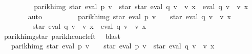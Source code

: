 \begin{isabellebody}
\ \ \ \ \isamarkupfalse%
\ \isamarkupfalse%
\ {\isachardoublequoteopen}{\isasymdots}\ {\isacharequal}{\kern0pt}\ parikh{\isacharunderscore}{\kern0pt}img\ {\isacharparenleft}{\kern0pt}star\ {\isacharparenleft}{\kern0pt}eval\ p\ v{\isacharparenright}{\kern0pt}\ {\isacharat}{\kern0pt}{\isacharat}{\kern0pt}\ star\ {\isacharparenleft}{\kern0pt}star\ {\isacharparenleft}{\kern0pt}eval\ q\ v\ {\isacharat}{\kern0pt}{\isacharat}{\kern0pt}\ v\ x{\isacharparenright}{\kern0pt}\ {\isacharat}{\kern0pt}{\isacharat}{\kern0pt}\ eval\ q\ v\ {\isacharat}{\kern0pt}{\isacharat}{\kern0pt}\ v\ x{\isacharparenright}{\kern0pt}{\isacharparenright}{\kern0pt}{\isachardoublequoteclose}\isanewline
\ \ \ \ \ \ \isamarkupfalse%
\ auto\isanewline
\ \ \ \ \isamarkupfalse%
\ \isamarkupfalse%
\ {\isachardoublequoteopen}{\isasymdots}\ {\isacharequal}{\kern0pt}\ parikh{\isacharunderscore}{\kern0pt}img\ {\isacharparenleft}{\kern0pt}star\ {\isacharparenleft}{\kern0pt}eval\ p\ v{\isacharparenright}{\kern0pt}\ {\isacharat}{\kern0pt}{\isacharat}{\kern0pt}\ {\isacharparenleft}{\kern0pt}{\isacharbraceleft}{\kern0pt}{\isacharbrackleft}{\kern0pt}{\isacharbrackright}{\kern0pt}{\isacharbraceright}{\kern0pt}\ {\isasymunion}\ star\ {\isacharparenleft}{\kern0pt}eval\ q\ v\ {\isacharat}{\kern0pt}{\isacharat}{\kern0pt}\ v\ x{\isacharparenright}{\kern0pt}\isanewline
\ \ \ \ \ \ \ \ {\isacharat}{\kern0pt}{\isacharat}{\kern0pt}\ star\ {\isacharparenleft}{\kern0pt}eval\ q\ v\ {\isacharat}{\kern0pt}{\isacharat}{\kern0pt}\ v\ x{\isacharparenright}{\kern0pt}\ {\isacharat}{\kern0pt}{\isacharat}{\kern0pt}\ eval\ q\ v\ {\isacharat}{\kern0pt}{\isacharat}{\kern0pt}\ v\ x{\isacharparenright}{\kern0pt}{\isacharparenright}{\kern0pt}{\isachardoublequoteclose}\isanewline
\ \ \ \ \ \ \isamarkupfalse%
\ parikh{\isacharunderscore}{\kern0pt}img{\isacharunderscore}{\kern0pt}star{}\ parikh{\isacharunderscore}{\kern0pt}conc{\isacharunderscore}{\kern0pt}left\ \isamarkupfalse%
\ blast\isanewline
\ \ \ \ \isamarkupfalse%
\ \isamarkupfalse%
\ {\isachardoublequoteopen}{\isasymdots}\ {\isacharequal}{\kern0pt}\ parikh{\isacharunderscore}{\kern0pt}img\ {\isacharparenleft}{\kern0pt}star\ {\isacharparenleft}{\kern0pt}eval\ p\ v{\isacharparenright}{\kern0pt}\ {\isacharat}{\kern0pt}{\isacharat}{\kern0pt}\ {\isacharbraceleft}{\kern0pt}{\isacharbrackleft}{\kern0pt}{\isacharbrackright}{\kern0pt}{\isacharbraceright}{\kern0pt}\ {\isasymunion}\ star\ {\isacharparenleft}{\kern0pt}eval\ p\ v{\isacharparenright}{\kern0pt}\ {\isacharat}{\kern0pt}{\isacharat}{\kern0pt}\ star\ {\isacharparenleft}{\kern0pt}eval\ q\ v\ {\isacharat}{\kern0pt}{\isacharat}{\kern0pt}\ v\ x{\isacharparenright}{\kern0pt}\isanewline

\end{isabellebody}
